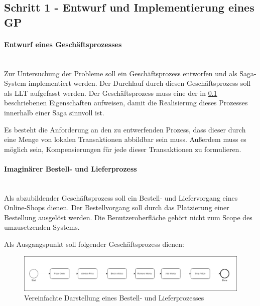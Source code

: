 \subsection{Schritt 1 - Entwurf und Implementierung eines GP}


\paragraph*{Entwurf eines Geschäftsprozesses} \mbox{}\\

Zur Untersuchung der Probleme soll ein Geschäftsprozess entworfen und als Saga-System implementiert werden. Der Durchlauf durch diesen Geschäftsprozess soll als LLT aufgefasst werden. Der Geschäftsprozess muss eine der in \ref{} beschriebenen Eigenschaften aufweisen, damit die Realisierung dieses Prozesses innerhalb einer Saga sinnvoll ist.  

Es besteht die Anforderung an den zu entwerfenden Prozess, dass dieser durch eine Menge von lokalen Transaktionen abbildbar sein muss. Außerdem muss es möglich sein, Kompensierungen für jede dieser Transaktionen zu formulieren. 

\paragraph*{Imaginärer Bestell- und Lieferprozess} \mbox{}\\

Als abzubildender Geschäftsprozess soll ein Bestell- und Liefervorgang eines Online-Shops dienen. Der Bestellvorgang soll durch das Platzierung einer Bestellung ausgelöst werden. Die Benutzeroberfläche gehört nicht zum Scope des umzusetzenden Systems. 

Als Ausgangspunkt soll folgender Geschäftsprozess dienen:

\begin{figure}[h!]
	\includegraphics[width=\linewidth]{figures/SimplifiedBusinessProcess.png}
	\caption{Vereinfachte Darstellung eines Bestell- und Lieferprozesses}
\end{figure}



